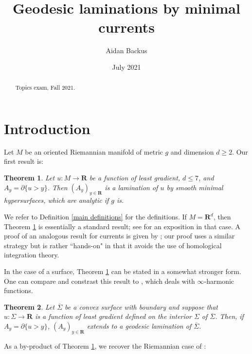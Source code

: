 \documentclass[reqno,12pt,letterpaper]{amsart}
\title[Geodesic laminations by minimal currents]{Geodesic laminations by minimal currents}
\author{Aidan Backus}
\date{July 2021}
\newcommand{\RR}{\mathbf{R}}
\newtheorem{theorem}{Theorem}[section]
\theoremstyle{definition}
\numberwithin{equation}{section}
\begin{document}
\begin{abstract}
Topics exam, Fall 2021.
\end{abstract}

\maketitle



\section{Introduction}
Let $M$ be an oriented Riemannian manifold of metric $g$ and dimension $d \geq 2$.
Our first result is:

\begin{theorem}\label{main thm}
Let $u: M \to \RR$ be a function of least gradient, $d \leq 7$, and $A_y = \partial \{u > y\}$.
Then $(A_y)_{y \in \RR}$ is a lamination of $u$ by smooth minimal hypersurfaces, which are analytic if $g$ is.
\end{theorem}

We refer to Definition \ref{main definitions} for the definitions.
If $M = \RR^d$, then Theorem \ref{main thm} is essentially a standard result; see \cite[Proposition 3.4]{górny2017planar} for an exposition in that case.
A proof of an analogous result for currents is given by \cite[\S5.3]{federer2014geometric}; our proof uses a similar strategy but is rather ``hands-on" in that it avoids the use of homological integration theory.

In the case of a surface, Theorem \ref{main thm} can be stated in a somewhat stronger form.
One can compare and constrast this result to \cite[Theorem 5.2]{daskalopoulos2020transverse}, which deals with $\infty$-harmonic functions.

\begin{theorem}\label{main crly}
Let $\overline \Sigma$ be a convex surface with boundary and suppose that $u: \Sigma \to \RR$ is a function of least gradient defined on the interior $\Sigma$ of $\overline \Sigma$.
Then, if $A_y = \partial \{u > y\}$, $(A_y)_{y \in \RR}$ extends to a geodesic lamination of $\overline \Sigma$.
\end{theorem}

As a by-product of Theorem \ref{main thm}, we recover the Riemannian case of \cite[Theorem 5.3.20]{federer2014geometric}:
\end{document}
